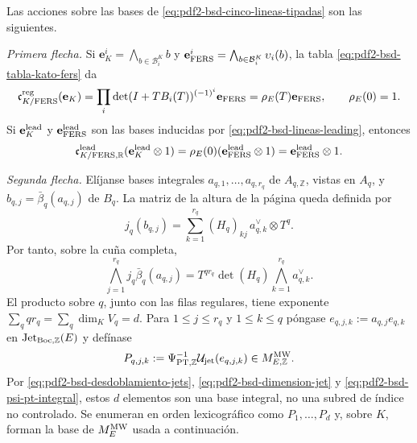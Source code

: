 \begin{proposition}
\label{prop:pdf2-bsd-cuatro-flechas-generadores}
Las acciones sobre las bases de
\eqref{eq:pdf2-bsd-cinco-lineas-tipadas} son las siguientes.

\emph{Primera flecha.} Si
$\mathbf e_K^i=\bigwedge_{b\in\mathcal B_i^K}b$ y
$\mathbf e_{\rm FERS}^i=\bigwedge_{b\in\mathcal B_i^K}\upsilon_i(b)$,
la tabla \eqref{eq:pdf2-bsd-tabla-kato-fers} da
\begin{equation}\label{eq:pdf2-bsd-c1-generadores}
 \mathfrak c_{K/{\rm FERS}}^{\rm reg}(\mathbf e_K)
 =\prod_i\det(I+TB_i(T))^{(-1)^i}\mathbf e_{\rm FERS}
 =\rho_E(T)\mathbf e_{\rm FERS},
 \qquad \rho_E(0)=1.
\end{equation}
Si $\mathbf e_K^{\rm lead}$ y $\mathbf e_{\rm FERS}^{\rm lead}$ son las
bases inducidas por \eqref{eq:pdf2-bsd-lineas-leading}, entonces
\begin{equation}\label{eq:pdf2-bsd-c1-leading-generador}
 \mathfrak c_{K/{\rm FERS},\mathbb R}^{\rm lead}
     (\mathbf e_K^{\rm lead}\otimes1)
 =\rho_E(0)(\mathbf e_{\rm FERS}^{\rm lead}\otimes1)
 =\mathbf e_{\rm FERS}^{\rm lead}\otimes1.
\end{equation}

\emph{Segunda flecha.} Elíjanse bases integrales
$a_{q,1},\ldots,a_{q,r_q}$ de $A_{q,\mathbb Z}$, vistas en $A_q$, y
$b_{q,j}=\bar\beta_q(a_{q,j})$ de $B_q$. La matriz de la altura de la página
queda definida por
\begin{equation}\label{eq:pdf2-bsd-hq-generadores}
 j_q(b_{q,j})=
 \sum_{k=1}^{r_q}(H_q)_{kj}\,a_{q,k}^\vee\otimes T^q.
\end{equation}
Por tanto, sobre la cuña completa,
\begin{equation}\label{eq:pdf2-bsd-c2-cuna-paginas}
 \bigwedge_{j=1}^{r_q}j_q\bar\beta_q(a_{q,j})
 =T^{qr_q}\det(H_q)
  \bigwedge_{k=1}^{r_q}a_{q,k}^\vee.
\end{equation}
El producto sobre $q$, junto con las filas regulares, tiene exponente
$\sum_q qr_q=\sum_q\dim_K V_q=d$. Para
$1\leq j\leq r_q$ y $1\leq k\leq q$ póngase
$e_{q,j,k}:=a_{q,j}e_{q,k}$ en
$\operatorname{Jet}_{\rm Boc,\mathbb Z}(E)$ y defínase
\begin{equation}\label{eq:pdf2-bsd-base-mw-desde-jets}
 P_{q,j,k}:=\Psi_{{\rm PT},\mathbb Z}^{-1}
       \mathcal U_{\rm jet}(e_{q,j,k})
 \in M_{E,\mathbb Z}^{\rm MW}.
\end{equation}
Por \eqref{eq:pdf2-bsd-desdoblamiento-jets},
\eqref{eq:pdf2-bsd-dimension-jet} y
\eqref{eq:pdf2-bsd-psi-pt-integral}, estos $d$ elementos son una base
integral, no una subred de índice no controlado. Se enumeran en orden
lexicográfico como $P_1,\ldots,P_d$ y, sobre $K$, forman la base de
$M_E^{\rm MW}$ usada a continuación.


\end{proposition}
